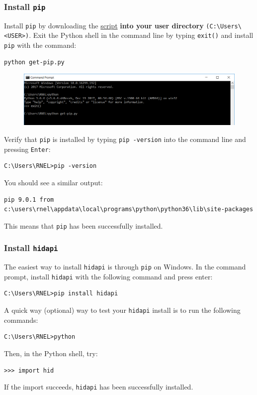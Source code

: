 \documentclass[10pt,oneside,a4paper]{article}
\begin{document}
\subsubsection{Install \texttt{pip}}
Install \texttt{pip} by downloading the \href{https://bootstrap.pypa.io/get-pip.py}{\color{blue}script} \textbf{into your user directory} \texttt{(C:\textbackslash Users\textbackslash <USER>)}. Exit the Python shell in the command line by typing \texttt{exit()} and install \texttt{pip} with the command:
\begin{verbatim}
python get-pip.py
\end{verbatim}
\begin{figure}[H]
\includegraphics[width=\textwidth]{pip.png}
\end{figure}
Verify that \texttt{pip} is installed by typing \texttt{pip -version} into the command line and pressing \texttt{Enter}:
\begin{verbatim}
C:\Users\RNEL>pip -version
\end{verbatim}
You should see a similar output:
\begin{verbatim}
pip 9.0.1 from c:\users\rnel\appdata\local\programs\python\python36\lib\site-packages
\end{verbatim}
This means that \texttt{pip} has been successfully installed.
\subsubsection{Install \texttt{hidapi}}
The easiest way to install \texttt{hidapi} is through \texttt{pip} on Windows. In the command prompt, install  \texttt{hidapi} with the following command and press enter:
\begin{verbatim}
C:\Users\RNEL>pip install hidapi
\end{verbatim}
A quick way (optional) way to test your \texttt{hidapi} install is to run the following commands:
\begin{verbatim}
C:\Users\RNEL>python
\end{verbatim}
Then, in the Python shell, try:
\begin{verbatim}
>>> import hid
\end{verbatim}
If the import succeeds, \texttt{hidapi} has been successfully installed.
\end{document}
